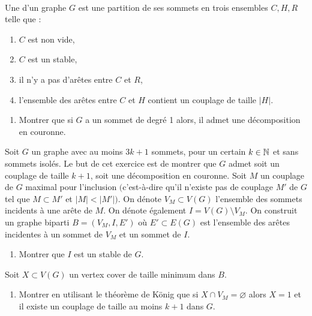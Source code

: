 \begin{td-exo}\,\\
    Une  d'un graphe \(G\) est une partition de ses sommets en trois ensembles \(C, H, R\) telle que :
    \begin{enumerate}[label=(\roman*)]
        \item \(C\) est non vide,
        \item \(C\) est un stable,
        \item il n'y a pas d'ar\^etes entre \(C\) et \(R\),
        \item l'ensemble des ar\^etes entre \(C\) et \(H\) contient un couplage de taille \(\left| H \right|\).
    \end{enumerate}

    \begin{enumerate}
        \item Montrer que si \(G\) a un sommet de degr\'e 1 alors, il admet une d\'ecomposition en couronne.
    \end{enumerate}
    Soit \(G\) un graphe avec au moins \(3k + 1\) sommets, pour un certain \(k \in \mathbb{N}\) et sans sommets isol\'es.
    Le but de cet exercice est de montrer que \(G\) admet soit un couplage de taille \(k+1\), soit une d\'ecomposition en couronne.
    Soit \(M\) un couplage de \(G\) maximal pour l'inclusion \(\big(\)c'est-\`a-dire qu'il n'existe pas de couplage \(M'\) de \(G\) tel que \(M \subset M'\) et \(\left| M \right| < \left| M' \right|\big)\).
    On d\'enote \(V_M \subset V(G)\) l'ensemble des sommets incidents \`a une ar\^ete de \(M\).
    On d\'enote \'egalement \(I = V(G) \setminus V_M\).
    On construit un graphe biparti \(B = (V_M, I, E')\) o\`u \(E' \subset E(G)\) est l'ensemble des ar\^etes incidentes \`a un sommet de \(V_M\) et un sommet de \(I\).

    \begin{enumerate}[start=2]
        \item Montrer que \(I\) est un stable de \(G\).
    \end{enumerate}

    Soit \(X \subset V(G)\) un vertex cover de taille minimum dans \(B\).

    \begin{enumerate}[start=3]
        \item Montrer en utilisant le th\'eor\`eme de K\"onig que si \(X \cap V_M = \varnothing\) alors \(X = 1\) et il existe un couplage de taille au moins \(k + 1\) dans \(G\).


\end{enumerate}
\end{td-exo}
